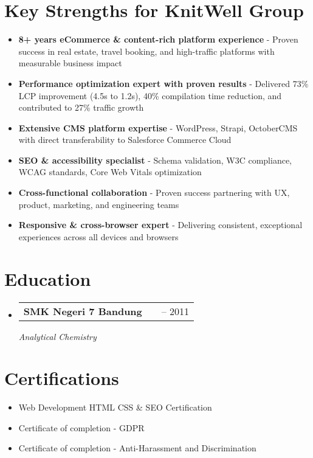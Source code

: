 \documentclass[a4paper, 11pt]{article}
\newcommand{\resumeSubheading}[4]{
  \vspace{-2pt}\item
    \begin{tabularx}{0.987\textwidth}[t]{
  >{\raggedright\arraybackslash}X
  >{\centering\arraybackslash}X
  >{\raggedleft\arraybackslash}X }
      \textbf{#1} & #2 & #3 \\
    \end{tabularx}
    \textit{\small#4}\\
    \vspace{-7pt}
}
\newcommand{\resumeSubHeadingListStart}{\begin{itemize}[leftmargin=0.1in, label={}]}
\newcommand{\resumeSubHeadingListEnd}{\end{itemize}\vspace{5pt}}
\begin{document}
\section{Key Strengths for KnitWell Group}
\begin{itemize}[leftmargin=0.22in, itemsep=2pt]
    \item \textbf{8+ years eCommerce \& content-rich platform experience} - Proven success in real estate, travel booking, and high-traffic platforms with measurable business impact
    \item \textbf{Performance optimization expert with proven results} - Delivered 73\% LCP improvement (4.5s to 1.2s), 40\% compilation time reduction, and contributed to 27\% traffic growth
    \item \textbf{Extensive CMS platform expertise} - WordPress, Strapi, OctoberCMS with direct transferability to Salesforce Commerce Cloud
    \item \textbf{SEO \& accessibility specialist} - Schema validation, W3C compliance, WCAG standards, Core Web Vitals optimization
    \item \textbf{Cross-functional collaboration} - Proven success partnering with UX, product, marketing, and engineering teams
    \item \textbf{Responsive \& cross-browser expert} - Delivering consistent, exceptional experiences across all devices and browsers
\end{itemize}

\section{Education}
\resumeSubHeadingListStart
    \resumeSubheading
        {SMK Negeri 7 Bandung}{}{2009 -- 2011}
        {Analytical Chemistry}
\resumeSubHeadingListEnd

\section{Certifications}
\begin{itemize}[leftmargin=0.22in, itemsep=0pt]
    \item Web Development HTML CSS \& SEO Certification
    \item Certificate of completion - GDPR
    \item Certificate of completion - Anti-Harassment and Discrimination
\end{itemize}

\end{document}
